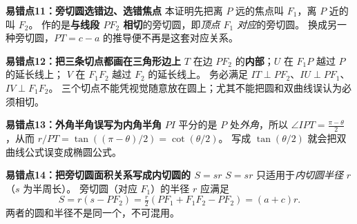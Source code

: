 \begin{trapbox}
\medskip
\textbf{\textcolor{CTrap}{易错点11：旁切圆选错边、选错焦点}}
本证明先把离 $P$ 远的焦点叫 $F_1$，离 $P$ 近的叫 $F_2$。
作的是\textbf{与线段 $PF_2$ 相切}的旁切圆，即\emph{顶点 $F_1$ 对应}的旁切圆。
换成另一种旁切圆，$PT=c-a$ 的推导便不再是这套对应关系。

\medskip
\textbf{\textcolor{CTrap}{易错点12：把三条切点都画在三角形边上}}
$T$ 在边 $PF_2$ 的\textbf{内部}；$U$ 在 $F_1P$ 越过 $P$ 的延长线上；
$V$ 在 $F_1F_2$ 越过 $F_2$ 的延长线上。
务必满足 $IT\perp PF_2$、$IU\perp PF_1$、$IV\perp F_1F_2$。
三个切点不能凭视觉随意放在圆上；尤其不能把圆和双曲线误认为必须相切。

\medskip
\textbf{\textcolor{CTrap}{易错点13：外角半角误写为内角半角}}
$PI$ 平分的是 $P$ 处\emph{外角}，所以
$\angle IPT=\frac{\pi-\theta}{2}$，从而
$r/PT=\tan((\pi-\theta)/2)=\cot(\theta/2)$。
写成 $\tan(\theta/2)$ 就会把双曲线公式误变成椭圆公式。

\medskip
\textbf{\textcolor{CTrap}{易错点14：把旁切圆面积关系写成内切圆的 $S=sr$}}
$S=sr$ 只适用于\emph{内切圆半径} $r$（$s$ 为半周长）。
旁切圆（对应 $F_1$）的半径 $r$ 应满足
\[
 S=r(s-PF_2)=\tfrac r2(PF_1+F_1F_2-PF_2)=(a+c)r.
\]
两者的圆和半径不是同一个，不可混用。

\end{trapbox}
